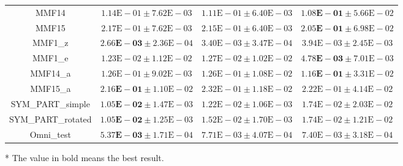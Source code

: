 \begin{table}[htbp]
\begin{tabular}{cccc}
		MMF14 & $1.14\text{E}-01 \pm 7.62\text{E}-03$ & $1.11\text{E}-01 \pm 6.40\text{E}-03$ & $\mathbf{1.08\text{E}-01} \pm 5.66\text{E}-02$\\
		MMF15 & $2.17\text{E}-01 \pm 7.62\text{E}-03$ & $2.15\text{E}-01 \pm 6.40\text{E}-03$ & $\mathbf{2.05\text{E}-01} \pm 6.98\text{E}-02$\\
		MMF1\_z & $\mathbf{2.66\text{E}-03} \pm 2.36\text{E}-04$ & $3.40\text{E}-03 \pm 3.47\text{E}-04$ & $3.94\text{E}-03 \pm 2.45\text{E}-03$\\
		MMF1\_e & $1.23\text{E}-02 \pm 1.12\text{E}-02$ & $1.27\text{E}-02 \pm 1.02\text{E}-02$ & $\mathbf{4.78\text{E}-03} \pm 7.01\text{E}-03$\\
		MMF14\_a & $1.26\text{E}-01 \pm 9.02\text{E}-03$ & $1.26\text{E}-01 \pm 1.08\text{E}-02$ & $\mathbf{1.16\text{E}-01} \pm 3.31\text{E}-02$\\
		MMF15\_a & $\mathbf{2.16\text{E}-01} \pm 1.10\text{E}-02$ & $2.32\text{E}-01 \pm 1.18\text{E}-02$ & $2.22\text{E}-01 \pm 4.14\text{E}-02$\\
		SYM\_PART\_simple & $\mathbf{1.05\text{E}-02} \pm 1.47\text{E}-03$ & $1.22\text{E}-02 \pm 1.06\text{E}-03$ & $1.74\text{E}-02 \pm 2.03\text{E}-02$\\
		SYM\_PART\_rotated & $\mathbf{1.05\text{E}-02} \pm 1.25\text{E}-03$ & $1.52\text{E}-02 \pm 1.70\text{E}-03$ & $1.74\text{E}-02 \pm 1.21\text{E}-02$\\
		Omni\_test & $\mathbf{5.37\text{E}-03} \pm 1.71\text{E}-04$ & $7.71\text{E}-03 \pm 4.07\text{E}-04$ & $7.40\text{E}-03 \pm 3.18\text{E}-04$\\
		\bottomrule
	\end{tabular}
	\begin{tablenotes}
		\item[*] The value in bold means the best result.
	\end{tablenotes}
\end{table}

